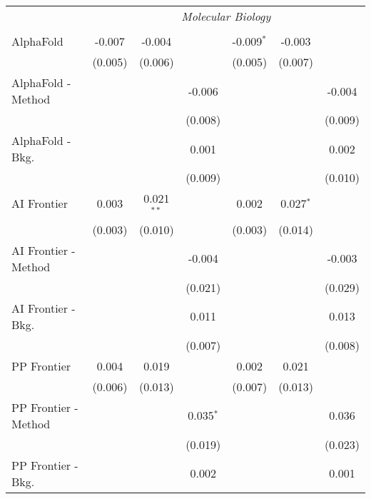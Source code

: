 \begin{tabular}{lcccccc}
 & \multicolumn{6}{c}{\textit{Molecular Biology}} \\ \\
   AlphaFold            & -0.007  & -0.004        &             & -0.009$^{*}$ & -0.003         &   \\   
                        & (0.005) & (0.006)       &             & (0.005)      & (0.007)        &   \\   
   AlphaFold - Method   &         &               & -0.006      &              &                & -0.004\\   
                        &         &               & (0.008)     &              &                & (0.009)\\   
   AlphaFold - Bkg.     &         &               & 0.001       &              &                & 0.002\\   
                        &         &               & (0.009)     &              &                & (0.010)\\   
   AI Frontier          & 0.003   & 0.021$^{**}$  &             & 0.002        & 0.027$^{*}$    &   \\   
                        & (0.003) & (0.010)       &             & (0.003)      & (0.014)        &   \\   
   AI Frontier - Method &         &               & -0.004      &              &                & -0.003\\   
                        &         &               & (0.021)     &              &                & (0.029)\\   
   AI Frontier - Bkg.   &         &               & 0.011       &              &                & 0.013\\   
                        &         &               & (0.007)     &              &                & (0.008)\\   
   PP Frontier          & 0.004   & 0.019         &             & 0.002        & 0.021          &   \\   
                        & (0.006) & (0.013)       &             & (0.007)      & (0.013)        &   \\   
   PP Frontier - Method &         &               & 0.035$^{*}$ &              &                & 0.036\\   
                        &         &               & (0.019)     &              &                & (0.023)\\   
   PP Frontier - Bkg.   &         &               & 0.002       &              &                & 0.001\\   

\end{tabular}

